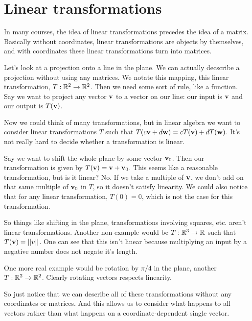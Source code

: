 \section{Linear transformations}

In many courses, the idea of linear transformations precedes the idea of a matrix. Basically without coordinates, linear transformations are objects by themselves, and with coordinates these linear transformations turn into matrices. 
\begin{example}
  Let's look at a projection onto a line in the plane. We can actually decscribe a projection without using any matrices. We notate this mapping, this linear transformation, $T: \mathbb{R}^2 \to \mathbb{R}^2$. Then we need some sort of rule, like a function. Say we want to project any vector $\boldsymbol{\mathbf{v}}$ to a vector on our line: our input is $\boldsymbol{\mathbf{v}}$ and our output is $T(\boldsymbol{\mathbf{v}})$.
\end{example}

Now we could think of many transformations, but in linear algebra we want to consider linear transformations $T$ such that $T(c\boldsymbol{\mathbf{v}}+d\boldsymbol{\mathbf{w}}) = cT(\boldsymbol{\mathbf{v}})+dT(\boldsymbol{\mathbf{w}})$. It's not really hard to decide whether a transformation is linear.

\begin{example}
  Say we want to shift the whole plane by some vector $\boldsymbol{\mathbf{v}}_0$. Then our transformation is given by $T(\boldsymbol{\mathbf{v}})=\boldsymbol{\mathbf{v}}+\boldsymbol{\mathbf{v}}_0$. This seems like a reasonable transformation, but is it linear? No. If we take a multiple of $\boldsymbol{\mathbf{v}}$, we don't add on that same multiple of $\boldsymbol{\mathbf{v}}_0$ in $T$, so it doesn't satisfy linearity. We could also notice that for any linear transformation, $T(0)=0$, which is not the case for this transformation. 
\end{example}

So things like shifting in the plane, transformations involving squares, etc. aren't linear transformations. Another non-example would be $T: \mathbb{R}^3\to\mathbb{R}$ such that $T(\boldsymbol{\mathbf{v}}) = ||v||$. One can see that this isn't linear because multiplying an input by a negative number does not negate it's length.

\begin{example}
  One more real example would be rotation by $\pi/4$ in the plane, another $T:\mathbb{R}^2\to\mathbb{R}^2$. Clearly rotating vectors respects linearity. 
\end{example}

So just notice that we can describe all of these transformations without any coordinates or matrices. And this allows us to consider what happens to all vectors rather than what happens on a coordinate-dependent single vector. 

